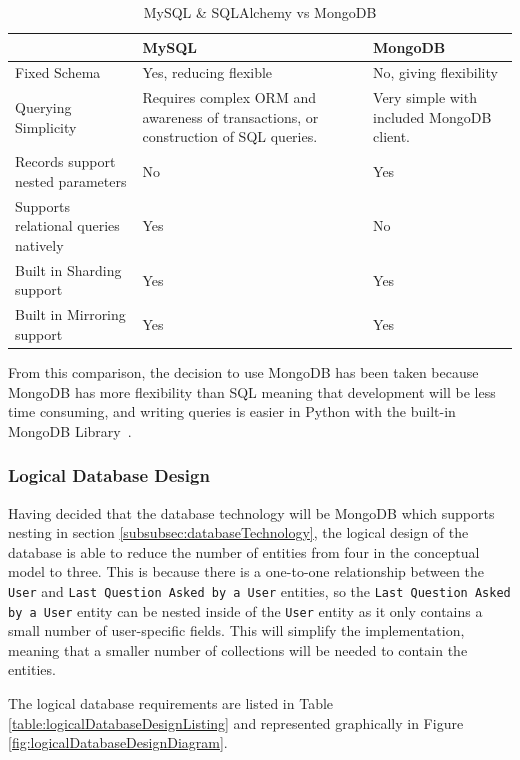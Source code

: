 \documentclass[authoryearcitations]{UoYCSproject}
\begin{document}
\begin{table}
\begin{center}
    \begin{tabular}{| p{4.0cm} | p{4.5cm} | p{4.0cm} |}
    \hline
     & MySQL & MongoDB \\ \hline
    Fixed Schema & Yes, reducing flexible & No, giving flexibility \\ \hline
    Querying Simplicity & Requires complex ORM and awareness of transactions, or construction of SQL queries. & Very simple with included MongoDB client. \\ \hline
    Records support nested parameters & No & Yes \\ \hline
    Supports relational queries natively & Yes & No \\ \hline
    Built in Sharding support & Yes & Yes \\ \hline
    Built in Mirroring support & Yes & Yes \\ \hline
    \end{tabular}
    \caption{MySQL \& SQLAlchemy vs MongoDB}
    \label{table:mysqlVsMongo}
\end{center}
\end{table}

From this comparison, the decision to use MongoDB has been taken because MongoDB has more flexibility than SQL meaning that development will be less time consuming, and writing queries is easier in Python with the built-in MongoDB Library~\cite{libraryPyMongo}.

\subsubsection{Logical Database Design}
Having decided that the database technology will be MongoDB which supports nesting in section \ref{subsubsec:databaseTechnology}, the logical design of the database is able to reduce the number of entities from four in the conceptual model to three.  This is because there is a one-to-one relationship between the \texttt{User} and \texttt{Last Question Asked by a User} entities, so the \texttt{Last Question Asked by a User} entity can be nested inside of the \texttt{User} entity as it only contains a small number of user-specific fields.  This will simplify the implementation, meaning that a smaller number of collections will be needed to contain the entities.

The logical database requirements are listed in Table \ref{table:logicalDatabaseDesignListing} and represented graphically in Figure \ref{fig:logicalDatabaseDesignDiagram}.
\end{document}
